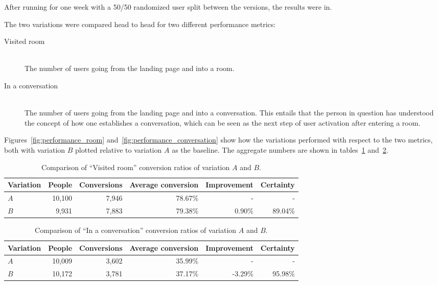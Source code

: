 After running for one week with a 50/50 randomized user split between the versions, the results were in.

The two variations were compared head to head for two different performance metrics:

\begin{description}
  \item[Visited room] \hfill \\
    The number of users going from the landing page and into a room.
  \item[In a conversation] \hfill \\
    The number of users going from the landing page and into a conversation. This entails that the person in question has understood the concept of how one establishes a conversation, which can be seen as the next step of user activation after entering a room.
\end{description}

Figures~\ref{fig:performance_room} and~\ref{fig:performance_conversation} show how the variations performed with respect to the two metrics, both with variation $B$ plotted relative to variation $A$ as the baseline.
The aggregate numbers are shown in tables~\ref{tab:performance_room} and~\ref{tab:performance_conversation}.

\begin{table}[h]
  \begin{tabular}{|l|r|r|r|r|r|}
    \hline
    Variation & People & Conversions & Average conversion & Improvement & Certainty \\ \hline
    $A$       & 10,100 & 7,946       & 78.67\%            & -           & -         \\ \hline
    $B$       &  9,931 & 7,883       & 79.38\%            & 0.90\%      & 89.04\%   \\ \hline
  \end{tabular}
  \caption{Comparison of ``Visited room'' conversion ratios of variation $A$ and $B$.}
  \label{tab:performance_room}
\end{table}

\begin{table}[h]
  \begin{tabular}{|l|r|r|r|r|r|}
    \hline
    Variation & People & Conversions & Average conversion & Improvement & Certainty \\ \hline
    $A$       & 10,009 & 3,602       & 35.99\%            & -           & -         \\ \hline
    $B$       & 10,172 & 3,781       & 37.17\%            & -3.29\%     & 95.98\%   \\ \hline
  \end{tabular}
  \caption{Comparison of ``In a conversation'' conversion ratios of variation $A$ and $B$.}
  \label{tab:performance_conversation}
\end{table}


